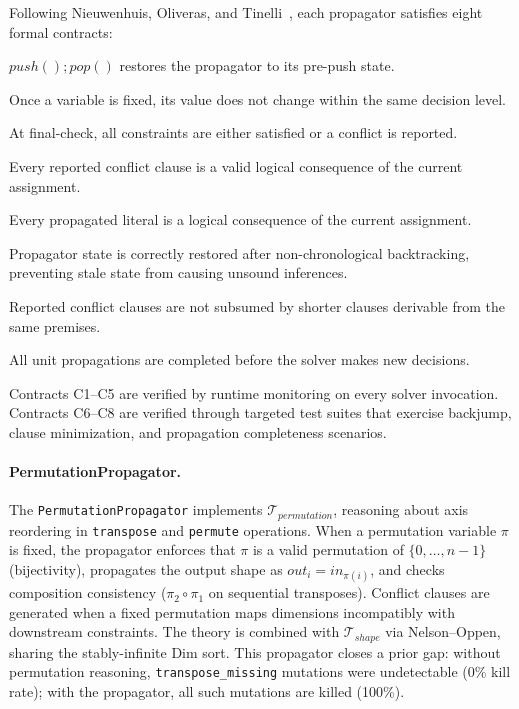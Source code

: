 \documentclass[11pt]{article}
\begin{document}
Following Nieuwenhuis, Oliveras, and Tinelli~\cite{nieuwenhuis06},
each propagator satisfies eight formal contracts:
\begin{description}[leftmargin=2em,style=nextline]
  \item[C1: Push-Pop Invertibility]
    $\mathit{push}(); \mathit{pop}()$ restores the propagator to
    its pre-push state.
  \item[C2: Fixed Monotonicity]
    Once a variable is fixed, its value does not change within
    the same decision level.
  \item[C3: Final Completeness]
    At final-check, all constraints are either satisfied or
    a conflict is reported.
  \item[C4: Conflict Soundness]
    Every reported conflict clause is a valid logical consequence
    of the current assignment.
  \item[C5: Propagation Soundness]
    Every propagated literal is a logical consequence of the
    current assignment.
  \item[C6: Backjump Correctness]
    Propagator state is correctly restored after non-chronological
    backtracking, preventing stale state from causing unsound
    inferences.
  \item[C7: Conflict Clause Minimality]
    Reported conflict clauses are not subsumed by shorter clauses
    derivable from the same premises.
  \item[C8: Exhaustive Propagation]
    All unit propagations are completed before the solver makes
    new decisions.
\end{description}
Contracts C1--C5 are verified by runtime monitoring on every
solver invocation.  Contracts C6--C8 are verified through targeted
test suites that exercise backjump, clause minimization, and
propagation completeness scenarios.

\paragraph{PermutationPropagator.}
The \texttt{PermutationPropagator} implements
$\mathcal{T}_{\mathit{permutation}}$, reasoning about axis
reordering in \texttt{transpose} and \texttt{permute} operations.
When a permutation variable $\pi$ is fixed, the propagator enforces
that $\pi$ is a valid permutation of $\{0, \ldots, n{-}1\}$
(bijectivity), propagates the output shape as
$\mathit{out}_i = \mathit{in}_{\pi(i)}$, and checks composition
consistency ($\pi_2 \circ \pi_1$ on sequential transposes).
Conflict clauses are generated when a fixed permutation maps
dimensions incompatibly with downstream constraints.
The theory is combined with $\mathcal{T}_{\mathit{shape}}$ via
Nelson--Oppen, sharing the stably-infinite Dim sort.
This propagator closes a prior gap: without permutation reasoning,
\texttt{transpose\_missing} mutations were undetectable (0\% kill
rate); with the propagator, all such mutations are killed (100\%).
\end{document}
